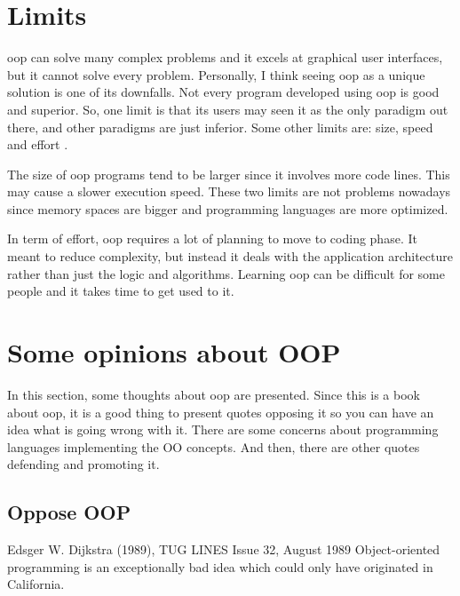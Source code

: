 \documentclass[12pt]{book}
\begin{document}
\section{Limits}

\ac{oop} can solve many complex problems and it excels at graphical user interfaces, but it cannot solve every problem. 
Personally, I think seeing \ac{oop} as a unique solution is one of its downfalls. 
Not every program developed using \ac{oop} is good and superior. 
So, one limit is that its users may seen it as the only paradigm out there, and other paradigms are just inferior.
Some other limits are: size, speed and effort \citep{2015-popyack-boady}.

The size of \ac{oop} programs tend to be larger since it involves more code lines. 
This may cause a slower execution speed. 
These two limits are not problems nowadays since memory spaces are bigger and programming languages are more optimized.

In term of effort, \ac{oop} requires a lot of planning to move to coding phase.
It meant to reduce complexity, but instead it deals with the application architecture rather than just the logic and algorithms.
Learning \ac{oop} can be difficult for some people and it takes time to get used to it.

\section{Some opinions about OOP}

In this section, some thoughts about \ac{oop} are presented. 
Since this is a book about \ac{oop}, it is a good thing to present quotes opposing it \citep{2016-yegor} so you can have an idea what is going wrong with it. 
There are some concerns about programming languages implementing the OO concepts. 
And then, there are other quotes defending and promoting it.

\subsection{Oppose OOP}

\begin{kodequote}{Edsger W. Dijkstra (1989), TUG LINES Issue 32, August 1989}
	Object-oriented programming is an exceptionally bad idea which could only have originated in California.
\end{kodequote}

\end{document}
